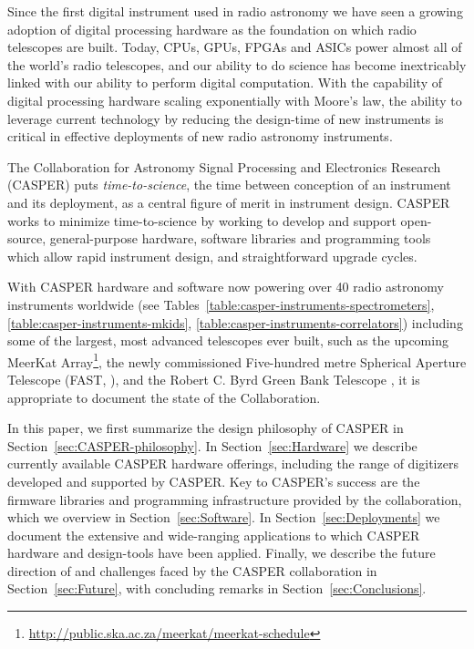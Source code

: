 \documentclass{ws-jai}
\begin{document}
Since the first digital instrument used in radio astronomy \citep{Weinreb} we
have seen a growing adoption of digital processing hardware as the foundation on
which radio telescopes are built.  Today, CPUs, GPUs, FPGAs and ASICs power
almost all of the world's radio telescopes, and our ability to do science has
become inextricably linked with our ability to perform digital computation.
With the capability of digital processing hardware scaling exponentially with
Moore's law, the ability to leverage current technology by reducing the
design-time of new instruments is critical in effective deployments of new radio
astronomy instruments.

The Collaboration for Astronomy Signal Processing and Electronics Research
(CASPER) puts \emph{time-to-science}, the time between conception of an
instrument and its deployment, as a central figure of merit in instrument
design. CASPER works to minimize time-to-science by working to develop and
support open-source, general-purpose hardware, software libraries and
programming tools which allow rapid instrument design, and straightforward
upgrade cycles.

With CASPER hardware and software now powering over 40 radio astronomy
instruments worldwide (see Tables~\ref{table:casper-instruments-spectrometers}, \ref{table:casper-instruments-mkids}, \ref{table:casper-instruments-correlators}) including some
of the largest, most advanced telescopes ever built, such as the upcoming
MeerKat Array\footnote{\url{http://public.ska.ac.za/meerkat/meerkat-schedule}}, the newly commissioned Five-hundred metre Spherical Aperture Telescope (FAST, \cite{fast}), and the Robert C. Byrd Green Bank Telescope \citep{vegas}, it is appropriate to document the state of the
Collaboration.

In this paper, we first summarize the design philosophy of CASPER in
Section~\ref{sec:CASPER-philosophy}.  In Section~\ref{sec:Hardware} we describe
currently available CASPER hardware offerings, including the range of digitizers
developed and supported by CASPER. Key to CASPER's success are the firmware
libraries and programming infrastructure provided by the collaboration, which we
overview in Section~\ref{sec:Software}.  In Section~\ref{sec:Deployments} we
document the extensive and wide-ranging applications to which CASPER hardware
and design-tools have been applied. Finally, we describe the future direction of
and challenges faced by the CASPER collaboration in Section~\ref{sec:Future},
with concluding remarks in Section~\ref{sec:Conclusions}.
\end{document}
